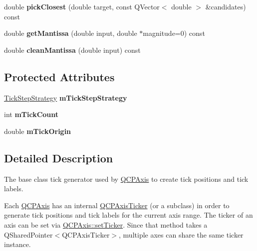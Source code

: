 \begin{DoxyCompactItemize}
\item 
double {\bfseries pick\+Closest} (double target, const Q\+Vector$<$ double $>$ \&candidates) const \hypertarget{classQCPAxisTicker_ae967cfb82e329d834a50c6f1f0d2a33d}{}\label{classQCPAxisTicker_ae967cfb82e329d834a50c6f1f0d2a33d}

\item 
double {\bfseries get\+Mantissa} (double input, double $\ast$magnitude=0) const \hypertarget{classQCPAxisTicker_a791ecd8c1a9c000f8e7fdb2578aca257}{}\label{classQCPAxisTicker_a791ecd8c1a9c000f8e7fdb2578aca257}

\item 
double {\bfseries clean\+Mantissa} (double input) const \hypertarget{classQCPAxisTicker_a534f5a2c9f8565c602a5423e944c7747}{}\label{classQCPAxisTicker_a534f5a2c9f8565c602a5423e944c7747}

\end{DoxyCompactItemize}
\subsection*{Protected Attributes}
\begin{DoxyCompactItemize}
\item 
\hyperlink{classQCPAxisTicker_ab6d2f9d9477821623ac9bc4b21ddf49a}{Tick\+Step\+Strategy} {\bfseries m\+Tick\+Step\+Strategy}\hypertarget{classQCPAxisTicker_ac059d6d670b2f6132c593fb4de156701}{}\label{classQCPAxisTicker_ac059d6d670b2f6132c593fb4de156701}

\item 
int {\bfseries m\+Tick\+Count}\hypertarget{classQCPAxisTicker_a14a35b47d1aad11b08d18ea0e25937b8}{}\label{classQCPAxisTicker_a14a35b47d1aad11b08d18ea0e25937b8}

\item 
double {\bfseries m\+Tick\+Origin}\hypertarget{classQCPAxisTicker_a560ef9347b1aa599a9bf0e2f29d3ec16}{}\label{classQCPAxisTicker_a560ef9347b1aa599a9bf0e2f29d3ec16}

\end{DoxyCompactItemize}


\subsection{Detailed Description}
The base class tick generator used by \hyperlink{classQCPAxis}{Q\+C\+P\+Axis} to create tick positions and tick labels. 

Each \hyperlink{classQCPAxis}{Q\+C\+P\+Axis} has an internal \hyperlink{classQCPAxisTicker}{Q\+C\+P\+Axis\+Ticker} (or a subclass) in order to generate tick positions and tick labels for the current axis range. The ticker of an axis can be set via \hyperlink{classQCPAxis_a4ee03fcd2c74d05cd1a419b9af5cfbdc}{Q\+C\+P\+Axis\+::set\+Ticker}. Since that method takes a {\ttfamily Q\+Shared\+Pointer$<$\+Q\+C\+P\+Axis\+Ticker$>$}, multiple axes can share the same ticker instance.

